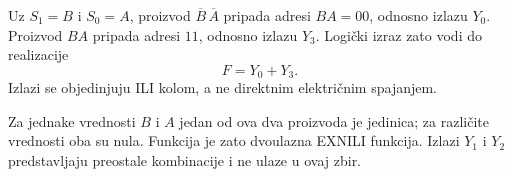 
Uz \(S_1=B\) i \(S_0=A\), proizvod \(\overline B\,\overline A\) pripada adresi \(BA=00\), odnosno izlazu \(Y_0\). Proizvod \(BA\) pripada adresi \(11\), odnosno izlazu \(Y_3\). Logički izraz zato vodi do realizacije
\[
 F=Y_0+Y_3.
\]
Izlazi se objedinjuju ILI kolom, a ne direktnim električnim spajanjem.

Za jednake vrednosti \(B\) i \(A\) jedan od ova dva proizvoda je jedinica; za različite vrednosti oba su nula. Funkcija je zato dvoulazna EXNILI funkcija. Izlazi \(Y_1\) i \(Y_2\) predstavljaju preostale kombinacije i ne ulaze u ovaj zbir.
